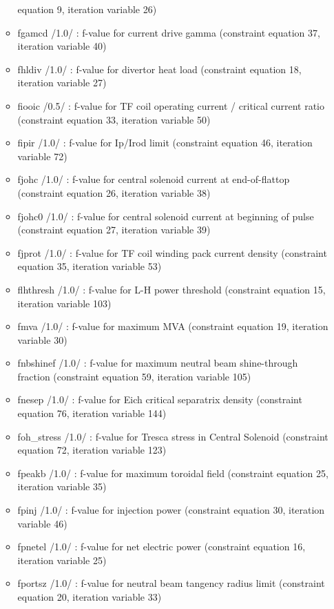 \documentclass[
]{article}
\begin{document}
\begin{itemize}
\begin{itemize}
    equation 9, iteration variable 26)
  \item
    fgamcd /1.0/ : f-value for current drive gamma (constraint equation
    37, iteration variable 40)
  \item
    fhldiv /1.0/ : f-value for divertor heat load (constraint equation
    18, iteration variable 27)
  \item
    fiooic /0.5/ : f-value for TF coil operating current / critical
    current ratio (constraint equation 33, iteration variable 50)
  \item
    fipir /1.0/ : f-value for Ip/Irod limit (constraint equation 46,
    iteration variable 72)
  \item
    fjohc /1.0/ : f-value for central solenoid current at end-of-flattop
    (constraint equation 26, iteration variable 38)
  \item
    fjohc0 /1.0/ : f-value for central solenoid current at beginning of
    pulse (constraint equation 27, iteration variable 39)
  \item
    fjprot /1.0/ : f-value for TF coil winding pack current density
    (constraint equation 35, iteration variable 53)
  \item
    flhthresh /1.0/ : f-value for L-H power threshold (constraint
    equation 15, iteration variable 103)
  \item
    fmva /1.0/ : f-value for maximum MVA (constraint equation 19,
    iteration variable 30)
  \item
    fnbshinef /1.0/ : f-value for maximum neutral beam shine-through
    fraction (constraint equation 59, iteration variable 105)
  \item
    fnesep /1.0/ : f-value for Eich critical separatrix density
    (constraint equation 76, iteration variable 144)
  \item
    foh\_stress /1.0/ : f-value for Tresca stress in Central Solenoid
    (constraint equation 72, iteration variable 123)
  \item
    fpeakb /1.0/ : f-value for maximum toroidal field (constraint
    equation 25, iteration variable 35)
  \item
    fpinj /1.0/ : f-value for injection power (constraint equation 30,
    iteration variable 46)
  \item
    fpnetel /1.0/ : f-value for net electric power (constraint equation
    16, iteration variable 25)
  \item
    fportsz /1.0/ : f-value for neutral beam tangency radius limit
    (constraint equation 20, iteration variable 33)

\end{itemize}
\end{itemize}
\end{document}
